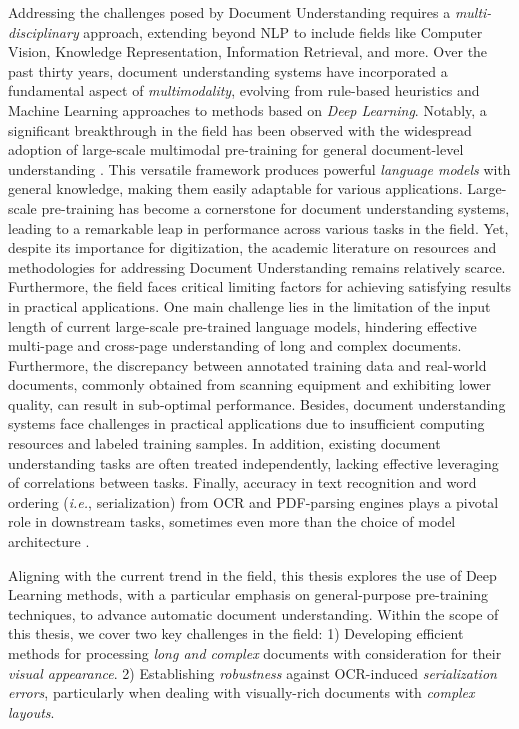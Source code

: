 Addressing the challenges posed by Document Understanding requires a \textit{multi-disciplinary} approach, extending beyond \ac{NLP} to include fields like Computer Vision, Knowledge Representation, Information Retrieval, and more. Over the past thirty years, document understanding systems have incorporated a fundamental aspect of \textit{multimodality}, evolving from rule-based heuristics and Machine Learning approaches to methods based on \textit{Deep Learning}. Notably, a significant breakthrough in the field has been observed with the widespread adoption of large-scale multimodal pre-training for general document-level understanding \citep{vaswani2017attention, xu2020layoutlm}. This versatile framework produces powerful \textit{language models} with general knowledge, making them easily adaptable for various applications. Large-scale pre-training has become a cornerstone for document understanding systems, leading to a remarkable leap in performance across various tasks in the field. Yet, despite its importance for digitization, the academic literature on resources and methodologies for addressing Document Understanding remains relatively scarce. Furthermore, the field faces critical limiting factors for achieving satisfying results in practical applications. One main challenge lies in the limitation of the input length of current large-scale pre-trained language models, hindering effective multi-page and cross-page understanding of long and complex documents. Furthermore, the discrepancy between annotated training data and real-world documents, commonly obtained from scanning equipment and exhibiting lower quality, can result in sub-optimal performance. Besides, document understanding systems face challenges in practical applications due to insufficient computing resources and labeled training samples. In addition, existing document understanding tasks are often treated independently, lacking effective leveraging of correlations between tasks. Finally, accuracy in text recognition and word ordering (\textit{i.e.}, serialization) from \ac{OCR} and PDF-parsing engines plays a pivotal role in downstream tasks, sometimes even more than the choice of model architecture \citep{borchmann2021due}.

Aligning with the current trend in the field, this thesis explores the use of Deep Learning methods, with a particular emphasis on general-purpose pre-training techniques, to advance automatic document understanding. Within the scope of this thesis, we cover two key challenges in the field: 1) Developing efficient methods for processing \textit{long and complex} documents with consideration for their \textit{visual appearance}. 2) Establishing \textit{robustness} against \ac{OCR}-induced \textit{serialization errors}, particularly when dealing with visually-rich documents with \textit{complex layouts}.

